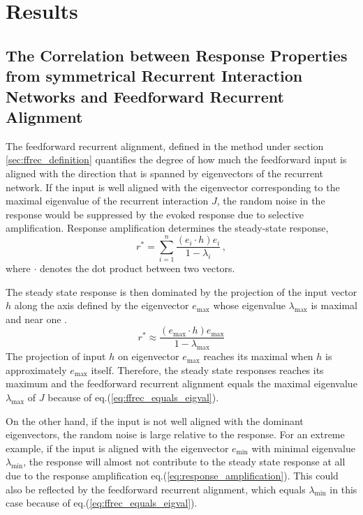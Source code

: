 \documentclass[11pt]{article}
\begin{document}
	\section{Results}
	
	\subsection{The Correlation between Response Properties from symmetrical Recurrent Interaction Networks and Feedforward Recurrent Alignment} \label{sec:results_symmetric}
	The feedforward recurrent alignment, defined in the method under section \ref{sec:ffrec_definition} quantifies the degree of how much the feedforward input is aligned with the direction that is spanned by eigenvectors of the recurrent network. If the input is well aligned with the eigenvector corresponding to the maximal eigenvalue of the recurrent interaction $J$, the random noise in the response would be suppressed by the evoked response due to selective amplification. Response amplification determines the steady-state response, 
		\begin{equation} \label{eq:response_amplification}
			r^* = \sum_{i = 1}^{n} \frac{(e_i \cdot h) e_i}{1-\lambda_i} \, ,
		\end{equation}
	where $\cdot$ denotes the dot product between two vectors. 
	
	The steady state response is then dominated by the projection of the input vector $h$ along the axis defined by the eigenvector $e_{\text{max}}$ whose eigenvalue $\lambda_{\text{max}}$ is maximal and near one \cite{dayan2005theoretical}. 
		\begin{equation} \label{eq:selective_amplification}
			r^* \approx \frac{(e_{\text{max}} \cdot h) e_{\text{max}}}{1 - \lambda_{\text{max}}}
		\end{equation}
	The projection of input $h$ on eigenvector $e_{\text{max}}$ reaches its maximal when $h$ is approximately $e_{\text{max}}$ itself. Therefore, the steady state responses reaches its maximum and the feedforward recurrent alignment equals the maximal eigenvalue $\lambda_{\text{max}}$ of $J$ because of eq.(\ref{eq:ffrec_equals_eigval}). 
	
	On the other hand, if the input is not well aligned with the dominant eigenvectors, the random noise is large relative to the response. For an extreme example, if the input is aligned with the eigenvector $e_{\text{min}}$ with minimal eigenvalue $\lambda_{\text{min}}$, the response will almost not contribute to the steady state response at all due to the response amplification eq.(\ref{eq:response_amplification}). This could also be reflected by the feedforward recurrent alignment, which equals $\lambda_{\text{min}}$ in this case because of eq.(\ref{eq:ffrec_equals_eigval}). 
	
\end{document}
